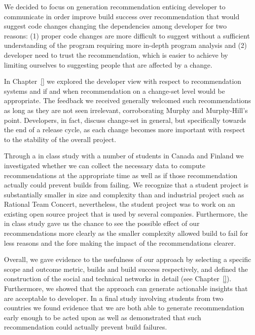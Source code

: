 We decided to focus on generation recommendation enticing developer to communicate in order improve build success over recommendation that would suggest code changes changing the dependencies among developer for two reasons:
(1) proper code changes are more difficult to suggest without a sufficient understanding of the program requiring more in-depth program analysis and 
(2) developer need to trust the recommendation, which is easier to achieve by limiting ourselves to suggesting people that are affected by a change.

In Chapter~\ref{} we explored the developer view with respect to recommendation systems and if and when recommendation on a change-set level would be appropriate.
The feedback we received generally welcomed such recommendations as long as they are not seen irrelevant, corroborating Murphy and Murphy-Hill's~\cite{} point.
Developers, in fact, discuss change-set in general, but specifically towards the end of a release cycle, as each change becomes more important with respect to the stability of the overall project.

Through a in class study with a number of students in Canada and Finland we investigated whether we can collect the necessary data to compute recommendations at the appropriate time as well as if those recommendation actually could prevent builds from failing.
We recognize that a student project is substantially smaller in size and complexity than and industrial project such as Rational Team Concert, nevertheless, the student project was to work on an existing open source project that is used by several companies.
Furthermore, the in class study gave us the chance to see the possible effect of our recommendations more clearly as the smaller complexity allowed build to fail for less reasons and the fore making the impact of the recommendations clearer.

Overall, we gave evidence to the usefulness of our approach by selecting a specific scope and outcome metric, builds and build success respectively, and defined the construction of the social and technical networks in detail (see Chapter~\ref{}).
Furthermore, we showed that the approach can generate actionable insights that are acceptable to developer.
In a final study involving students from two countries we found evidence that we are both able to generate recommendation early enough to be acted upon as well as demonstrated that such recommendation could actually prevent build failures.


